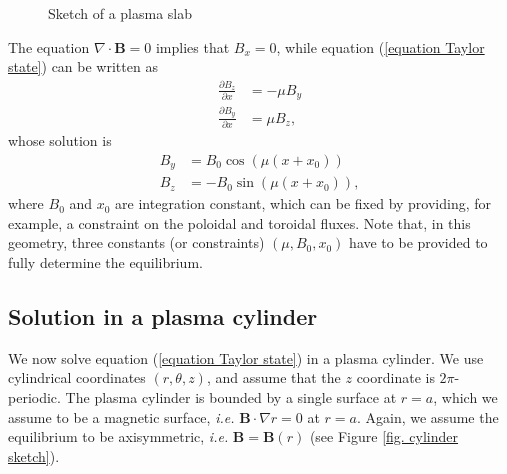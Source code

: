 \documentclass[my_thesis.tex]{subfiles}
\begin{document}
\begin{figure}
	\centering
	\caption{Sketch of a plasma slab}
	\label{fig. plasma slab}
\end{figure}

The equation $\nabla\cdot\mathbf{B}=0$ implies that $B_x=0$, while equation (\ref{equation Taylor state}) can be written as
\begin{align}
	\frac{\partial B_z}{\partial x} &= -\mu B_y\\
	\frac{\partial B_y}{\partial x} &= \mu B_z,
\end{align}
whose solution is
\begin{align}
	B_y &= B_0 \cos(\mu (x + x_0))\\
	B_z &= -B_0 \sin(\mu (x + x_0)),
\end{align}
where $B_0$ and $x_0$ are integration constant, which can be fixed by providing, for example, a constraint on the poloidal and toroidal fluxes. Note that, in this geometry, three constants (or constraints) $(\mu,B_0,x_0)$ have to be provided to fully determine the equilibrium.


\subsection{Solution in a plasma cylinder}
We now solve equation (\ref{equation Taylor state}) in a plasma cylinder. We use cylindrical coordinates $(r,\theta,z)$, and assume that the $z$ coordinate is $2\pi$-periodic. The plasma cylinder is bounded by a single surface at $r=a$, which we assume to be a magnetic surface,  \textit{i.e.} $\mathbf{B}\cdot\nabla r=0$ at $r=a$. Again, we assume the equilibrium to be axisymmetric, \textit{i.e.} $\mathbf{B}=\mathbf{B}(r)$ (see Figure \ref{fig. cylinder sketch}).
\end{document}
